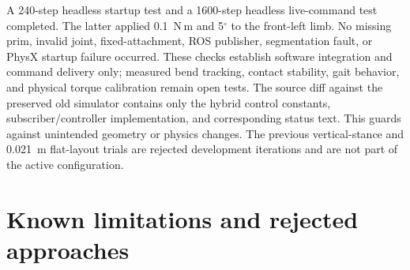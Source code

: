 \documentclass[11pt,letterpaper]{article}
\newcommand{\degrees}{\ensuremath{^{\circ}}}
\begin{document}
A 240-step headless startup test and a 1600-step headless live-command test
completed. The latter applied 0.1~N\,m and 5\degrees{} to the front-left limb.
No missing prim, invalid joint, fixed-attachment, ROS publisher, segmentation
fault, or PhysX startup failure occurred. These checks establish software
integration and command delivery only; measured bend tracking, contact
stability, gait behavior, and physical torque calibration remain open tests.
The source diff against the preserved old simulator contains only the hybrid
control constants, subscriber/controller implementation, and corresponding
status text. This guards against unintended geometry or physics changes. The
previous vertical-stance and 0.021~m flat-layout trials are rejected development
iterations and are not part of the active configuration.

\section{Known limitations and rejected approaches}
\end{document}
